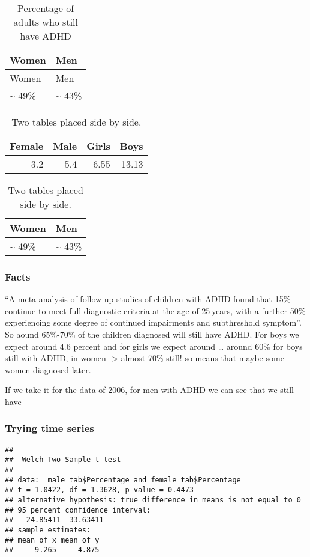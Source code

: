 \documentclass[
]{article}
\begin{document}
\begin{longtable}[]{@{}ll@{}}
\caption{Percentage of adults who still have ADHD}\tabularnewline
\toprule()
Women & Men \\
\midrule()
\endfirsthead
\toprule()
Women & Men \\
\midrule()
\endhead
\textasciitilde{} 49\% & \textasciitilde{} 43\% \\
\bottomrule()
\end{longtable}

\begin{table}
\caption{\label{tab:figure-side}Two tables placed side by side.}

\centering
\begin{tabular}[t]{rrrr}
\toprule
Female & Male & Girls & Boys\\
\midrule
3.2 & 5.4 & 6.55 & 13.13\\
\bottomrule
\end{tabular}
\centering
\begin{tabular}[t]{ll}
\toprule
Women & Men\\
\midrule
\textasciitilde{} 49\% & \textasciitilde{} 43\%\\
\bottomrule
\end{tabular}
\end{table}

\hypertarget{facts}{%
\subsubsection{Facts}\label{facts}}

``A meta-analysis of follow-up studies of children with ADHD found that
15\% continue to meet full diagnostic criteria at the age of 25 years,
with a further 50\% experiencing some degree of continued impairments
and subthreshold symptom''. So aound 65\%-70\% of the children diagnosed
will still have ADHD. For boys we expect around 4.6 percent and for
girls we expect around \ldots{} around 60\% for boys still with ADHD, in
women -\textgreater{} almost 70\% still! so means that maybe some women
diagnosed later.

If we take it for the data of 2006, for men with ADHD we can see that we
still have

\hypertarget{trying-time-series}{%
\subsubsection{Trying time series}\label{trying-time-series}}

\begin{verbatim}
## 
##  Welch Two Sample t-test
## 
## data:  male_tab$Percentage and female_tab$Percentage
## t = 1.0422, df = 1.3628, p-value = 0.4473
## alternative hypothesis: true difference in means is not equal to 0
## 95 percent confidence interval:
##  -24.85411  33.63411
## sample estimates:
## mean of x mean of y 
##     9.265     4.875
\end{verbatim}
\end{document}
